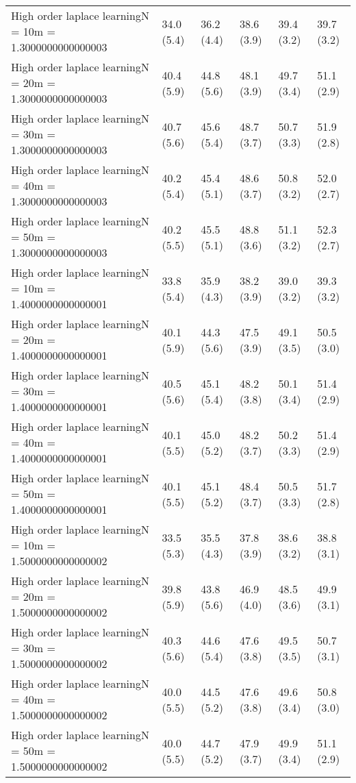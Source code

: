 \documentclass{article}
\begin{document}
\begin{table*}[t!]
\begin{center}
\begin{small}
\begin{sc}
\begin{tabular}{llllll}
High order laplace learningN = 10m = 1.3000000000000003&34.0 (5.4)      &36.2 (4.4)      &38.6 (3.9)      &39.4 (3.2)      &39.7 (3.2)      \\
High order laplace learningN = 20m = 1.3000000000000003&40.4 (5.9)      &44.8 (5.6)      &48.1 (3.9)      &49.7 (3.4)      &51.1 (2.9)      \\
High order laplace learningN = 30m = 1.3000000000000003&40.7 (5.6)      &45.6 (5.4)      &48.7 (3.7)      &50.7 (3.3)      &51.9 (2.8)      \\
High order laplace learningN = 40m = 1.3000000000000003&40.2 (5.4)      &45.4 (5.1)      &48.6 (3.7)      &50.8 (3.2)      &52.0 (2.7)      \\
High order laplace learningN = 50m = 1.3000000000000003&40.2 (5.5)      &45.5 (5.1)      &48.8 (3.6)      &51.1 (3.2)      &52.3 (2.7)      \\
High order laplace learningN = 10m = 1.4000000000000001&33.8 (5.4)      &35.9 (4.3)      &38.2 (3.9)      &39.0 (3.2)      &39.3 (3.2)      \\
High order laplace learningN = 20m = 1.4000000000000001&40.1 (5.9)      &44.3 (5.6)      &47.5 (3.9)      &49.1 (3.5)      &50.5 (3.0)      \\
High order laplace learningN = 30m = 1.4000000000000001&40.5 (5.6)      &45.1 (5.4)      &48.2 (3.8)      &50.1 (3.4)      &51.4 (2.9)      \\
High order laplace learningN = 40m = 1.4000000000000001&40.1 (5.5)      &45.0 (5.2)      &48.2 (3.7)      &50.2 (3.3)      &51.4 (2.9)      \\
High order laplace learningN = 50m = 1.4000000000000001&40.1 (5.5)      &45.1 (5.2)      &48.4 (3.7)      &50.5 (3.3)      &51.7 (2.8)      \\
High order laplace learningN = 10m = 1.5000000000000002&33.5 (5.3)      &35.5 (4.3)      &37.8 (3.9)      &38.6 (3.2)      &38.8 (3.1)      \\
High order laplace learningN = 20m = 1.5000000000000002&39.8 (5.9)      &43.8 (5.6)      &46.9 (4.0)      &48.5 (3.6)      &49.9 (3.1)      \\
High order laplace learningN = 30m = 1.5000000000000002&40.3 (5.6)      &44.6 (5.4)      &47.6 (3.8)      &49.5 (3.5)      &50.7 (3.1)      \\
High order laplace learningN = 40m = 1.5000000000000002&40.0 (5.5)      &44.5 (5.2)      &47.6 (3.8)      &49.6 (3.4)      &50.8 (3.0)      \\
High order laplace learningN = 50m = 1.5000000000000002&40.0 (5.5)      &44.7 (5.2)      &47.9 (3.7)      &49.9 (3.4)      &51.1 (2.9)      \\

\end{tabular}
\end{sc}
\end{small}
\end{center}
\end{table*}
\end{document}
